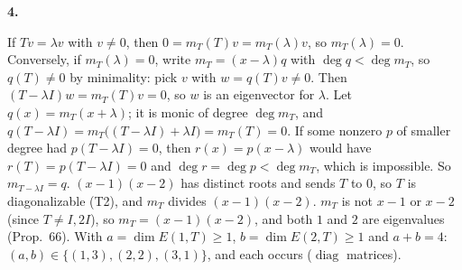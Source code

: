 \documentclass[10pt]{scrartcl}
\begin{document}
\textbf{4.}
\begin{enumerate}[a)]
  \ii If $Tv=\lambda v$ with $v\ne0$, then $0=m_T(T)v=m_T(\lambda)v$, so $m_T(\lambda)=0$. Conversely, if $m_T(\lambda)=0$, write $m_T=(x-\lambda)q$ with $\deg q<\deg m_T$, so $q(T)\ne0$ by minimality: pick $v$ with $w=q(T)v\ne0$. Then $(T-\lambda I)w=m_T(T)v=0$, so $w$ is an eigenvector for $\lambda$.
  \ii Let $q(x)=m_T(x+\lambda)$; it is monic of degree $\deg m_T$, and $q(T-\lambda I)=m_T\big((T-\lambda I)+\lambda I\big)=m_T(T)=0$. If some nonzero $p$ of smaller degree had $p(T-\lambda I)=0$, then $r(x)=p(x-\lambda)$ would have $r(T)=p(T-\lambda I)=0$ and $\deg r=\deg p<\deg m_T$, which is impossible. So $m_{T-\lambda I}=q$.
  \ii $(x-1)(x-2)$ has distinct roots and sends $T$ to $0$, so $T$ is diagonalizable (T2), and $m_T$ divides $(x-1)(x-2)$. $m_T$ is not $x-1$ or $x-2$ (since $T\ne I,2I$), so $m_T=(x-1)(x-2)$, and both $1$ and $2$ are eigenvalues (Prop.~66). With $a=\dim E(1,T)\ge1$, $b=\dim E(2,T)\ge1$ and $a+b=4$: $(a,b)\in\{(1,3),(2,2),(3,1)\}$, and each occurs ($\operatorname{diag}$ matrices).
\end{enumerate}
\end{document}
